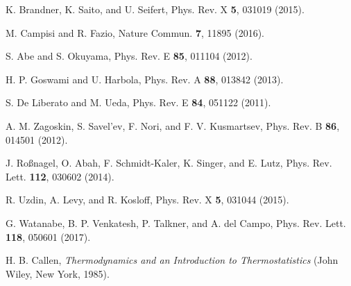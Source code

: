 \documentclass[aps,pra,floatfix,twocolumn,groupedaddress,superscriptaddress,nofootinbib,notitlepage,amsmath,amssymb,]{revtex4-1}
\begin{document}
\begin{thebibliography}{100}
 K. Brandner, K. Saito, and U. Seifert,  Phys. Rev. X \textbf{5}, 031019 (2015).

 M. Campisi and R. Fazio,  Nature Commun. \textbf{7}, 11895 (2016).

 S. Abe and S. Okuyama, Phys. Rev. E \textbf{85}, 011104 (2012).

 H. P. Goswami and U. Harbola, Phys. Rev. A \textbf{88}, 013842 (2013).

 S. De Liberato and M. Ueda, Phys. Rev. E \textbf{84}, 051122 (2011).

 A. M. Zagoskin, S. Savel'ev, F. Nori, and F. V. Kusmartsev, Phys. Rev. B \textbf{86}, 014501 (2012).

 J. Ro{\ss}nagel, O. Abah, F. Schmidt-Kaler, K. Singer, and E. Lutz, Phys. Rev. Lett. \textbf{112}, 030602 (2014).

 R. Uzdin, A. Levy, and R. Kosloff, Phys. Rev. X \textbf{5}, 031044 (2015).

 G. Watanabe, B. P. Venkatesh, P. Talkner, and A. del Campo, Phys. Rev. Lett. \textbf{118}, 050601 (2017).

 H. B. Callen, \emph{Thermodynamics and an Introduction to Thermostatistics} (John Wiley, New York, 1985).

\end{thebibliography}
\appendix
\end{document}
